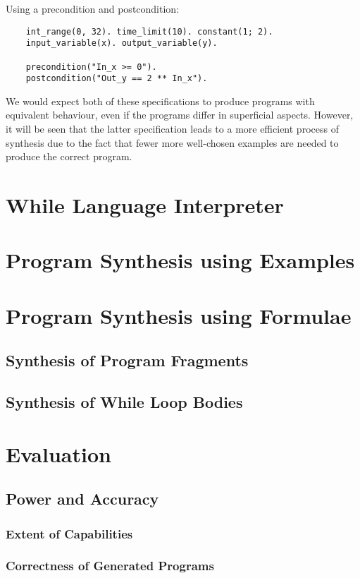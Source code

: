 \documentclass[a4paper,twoside,notitlepage]{article}
\begin{document}
Using a precondition and postcondition:
\begin{verbatim}
    int_range(0, 32). time_limit(10). constant(1; 2).    
    input_variable(x). output_variable(y).

    precondition("In_x >= 0").
    postcondition("Out_y == 2 ** In_x").
\end{verbatim}

We would expect both of these specifications to produce programs with 
equivalent behaviour, even if the programs differ in superficial aspects. 
However, it will be seen that the latter specification leads to a more 
efficient process of synthesis due to the fact that fewer more well-chosen 
examples are needed to produce the correct program.

\clearpage 

\section{While Language Interpreter}

\section{Program Synthesis using Examples} \label{sec:synexm}

\section{Program Synthesis using Formulae} \label{sec:synfrm}
\subsection{Synthesis of Program Fragments}
\subsection{Synthesis of While Loop Bodies}

\section{Evaluation}
\subsection{Power and Accuracy}
\subsubsection{Extent of Capabilities}
\subsubsection{Correctness of Generated Programs}
\end{document}
